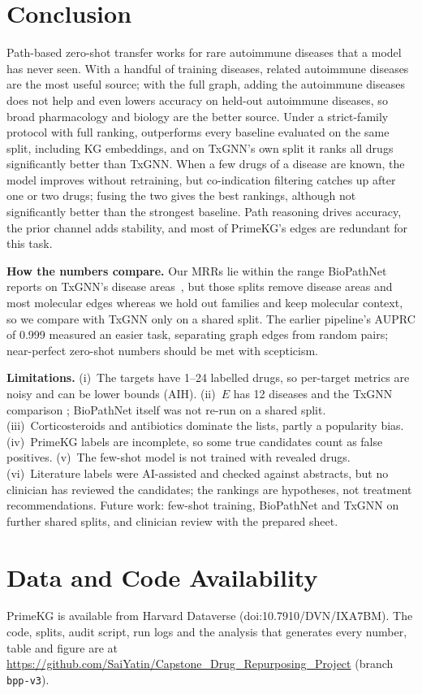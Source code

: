 \documentclass[journal]{IEEEtran}
\begin{document}
\section{Conclusion}
\label{sec:conclusion}
Path-based zero-shot transfer works for rare autoimmune diseases that a model has never seen. With a handful of training diseases, related autoimmune diseases are the most useful source; with the full graph, adding the autoimmune diseases does not help and even lowers accuracy on held-out autoimmune diseases, so broad pharmacology and biology are the better source. Under a strict-family protocol with full ranking, \sysname outperforms every baseline evaluated on the same split, including KG embeddings, and on TxGNN's own split it ranks all drugs significantly better than TxGNN. When a few drugs of a disease are known, the model improves without retraining, but co-indication filtering catches up after one or two drugs; fusing the two gives the best rankings, although not significantly better than the strongest baseline. Path reasoning drives accuracy, the prior channel adds stability, and most of PrimeKG's edges are redundant for this task.

\textbf{How the numbers compare.} Our MRRs lie within the range BioPathNet reports on TxGNN's disease areas~\cite{hu2026biopathnet}, but those splits remove disease areas and most molecular edges whereas we hold out families and keep molecular context, so we compare with TxGNN only on a shared split. The earlier pipeline's AUPRC of 0.999 measured an easier task, separating graph edges from random pairs; near-perfect zero-shot numbers should be met with scepticism.

\textbf{Limitations.} (i)~The targets have 1--24 labelled drugs, so per-target metrics are noisy and can be lower bounds (AIH). (ii)~$E$ has 12 diseases and the TxGNN comparison \TxhN; BioPathNet itself was not re-run on a shared split. (iii)~Corticosteroids and antibiotics dominate the lists, partly a popularity bias. (iv)~PrimeKG labels are incomplete, so some true candidates count as false positives. (v)~The few-shot model is not trained with revealed drugs. (vi)~Literature labels were AI-assisted and checked against abstracts, but no clinician has reviewed the candidates; the rankings are hypotheses, not treatment recommendations. Future work: few-shot training, BioPathNet and TxGNN on further shared splits, and clinician review with the prepared sheet.

\section*{Data and Code Availability}
{\raggedright PrimeKG is available from Harvard Dataverse (doi:10.7910/DVN/IXA7BM). The code, splits, audit script, run logs and the analysis that generates every number, table and figure are at \url{https://github.com/SaiYatin/Capstone_Drug_Repurposing_Project} (branch \texttt{bpp-v3}).\par}
\end{document}
